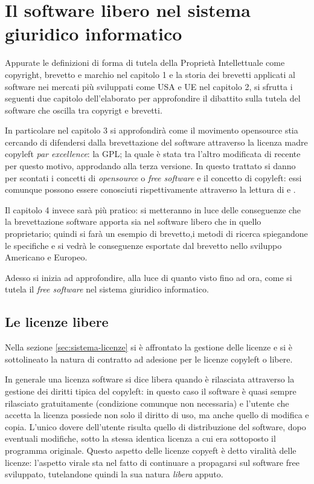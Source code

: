  \chapter{Il software libero nel sistema giuridico informatico}

Appurate le definizioni di forma di tutela della Proprietà Intellettuale come copyright, brevetto e marchio nel capitolo 1 e la storia dei brevetti applicati al software nei mercati più sviluppati come USA e UE nel capitolo 2, si sfrutta i seguenti due capitolo dell'elaborato per approfondire il dibattito sulla tutela del software che oscilla tra copyrigt e brevetti.

In particolare nel capitolo 3 si approfondirà come il movimento opensource stia cercando di difendersi dalla brevettazione del software attraverso la licenza madre copyleft \textit{par excellence}: la GPL; la quale è stata tra l'altro modificata di recente per questo motivo, approdando alla terza versione.
In questo trattato si danno per scontati i concetti di \textit{opensource} o \textit{free software} e il concetto di copyleft: essi comunque possono essere conosciuti rispettivamente attraverso la lettura di \cite[Compendio di libertà informatica e cultura open]{Aliprandi-compendio} e \cite[Copyleft e Opencontent]{Aliprandi-copyleft}.

Il capitolo 4 invece sarà più pratico: si metteranno in luce delle conseguenze che la brevettazione software apporta sia nel software libero che in quello proprietario; quindi si farà un esempio di brevetto,i metodi di ricerca spiegandone le specifiche e si vedrà le conseguenze esportate dal brevetto nello sviluppo Americano e Europeo.

Adesso si inizia ad approfondire, alla luce di quanto visto fino ad ora, come si tutela il \textit{free software} nel sistema giuridico informatico.


\section{Le licenze libere}

Nella sezione \ref{sec:sistema-licenze} si è affrontato la gestione delle licenze e si è sottolineato la natura di contratto ad adesione per le licenze copyleft o libere.

In generale una licenza software si dice libera quando è rilasciata attraverso la gestione dei diritti tipica del copyleft: in questo caso il software è quasi sempre rilasciato gratuitamente (condizione comunque non necessaria) e l'utente che accetta la licenza possiede non solo il diritto di uso, ma anche quello di modifica e copia. L'unico dovere dell'utente risulta quello di distribuzione del software, dopo eventuali modifiche, sotto la stessa identica licenza a cui era sottoposto il programma originale. Questo aspetto delle licenze copyeft è detto viralità delle licenze: l'aspetto virale sta nel fatto di continuare a propagarsi sul software free sviluppato, tutelandone quindi la sua natura \textit{libera} apputo.

